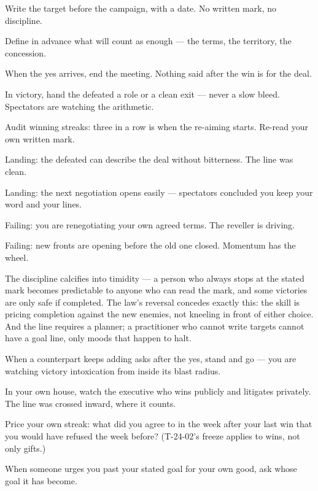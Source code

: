 \begin{application}
  \item Write the target before the campaign, with a date. No written mark, no discipline.
  \item Define in advance what will count as enough --- the terms, the territory, the concession.
  \item When the yes arrives, end the meeting. Nothing said after the win is for the deal.
  \item In victory, hand the defeated a role or a clean exit --- never a slow bleed. Spectators are watching the arithmetic.
  \item Audit winning streaks: three in a row is when the re-aiming starts. Re-read your own written mark.
\end{application}
\begin{feedback}
  \item Landing: the defeated can describe the deal without bitterness. The line was clean.
  \item Landing: the next negotiation opens easily --- spectators concluded you keep your word and your lines.
  \item Failing: you are renegotiating your own agreed terms. The reveller is driving.
  \item Failing: new fronts are opening before the old one closed. Momentum has the wheel.
\end{feedback}
\begin{failure}
The discipline calcifies into timidity --- a person who always stops at the stated mark becomes predictable to anyone who can read the mark, and some victories are only safe if completed. The law's reversal concedes exactly this: the skill is pricing completion against the new enemies, not kneeling in front of either choice. And the line requires a planner; a practitioner who cannot write targets cannot have a goal line, only moods that happen to halt.
\end{failure}
\begin{countermeasures}
  \item When a counterpart keeps adding asks after the yes, stand and go --- you are watching victory intoxication from inside its blast radius.
  \item In your own house, watch the executive who wins publicly and litigates privately. The line was crossed inward, where it counts.
  \item Price your own streak: what did you agree to in the week after your last win that you would have refused the week before? (T-24-02's freeze applies to wins, not only gifts.)
  \item When someone urges you past your stated goal for your own good, ask whose goal it has become.
\end{countermeasures}

\seesources
{}
